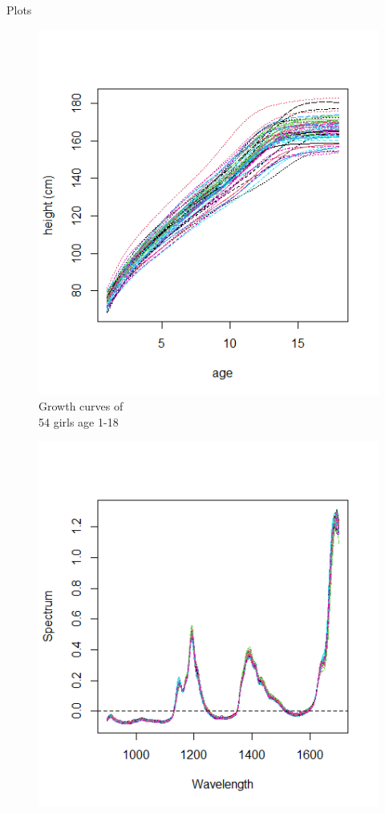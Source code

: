 \documentclass{beamer}
\begin{document}
	\begin{frame}{Plots}
		\begin{minipage}{.5\textwidth}
			\begin{figure}
				\includegraphics[width=\textwidth]{../Graphics/Growth_curves.png}
				\caption{Growth curves of \\ 54 girls age 1-18}
			\end{figure}
		\end{minipage}%
		\begin{minipage}{.5\textwidth}
			\begin{figure}
				\includegraphics[width=\textwidth]{../Graphics/NIR.png}

\end{figure}
\end{minipage}
\end{frame}
\end{document}
